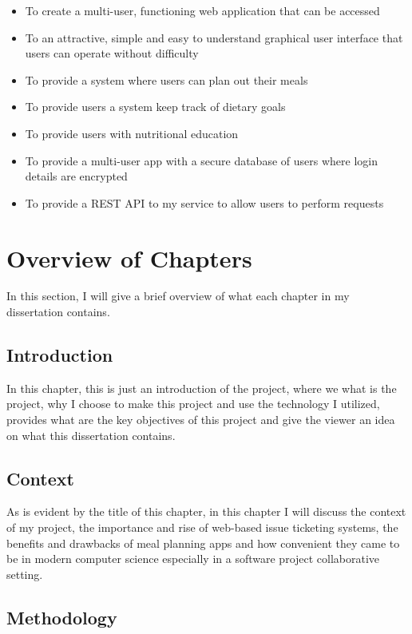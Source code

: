 \begin{itemize}
\item To create a multi-user, functioning web application that can be accessed
\item To an attractive, simple and easy to understand graphical user interface that users can operate without difficulty
\item To provide a system where users can plan out their meals
\item To provide users a system keep track of dietary goals
\item To provide users with nutritional education
\item To provide a multi-user app with a secure database of users where login details are encrypted
\item To provide a REST API to my service to allow users to perform requests
\end{itemize}

\section {Overview of Chapters}

In this section, I will give a brief overview of what each chapter in my dissertation contains.

\subsection{Introduction}

In this chapter, this is just an introduction of the project, where we what is the project, why I choose to make this project and use the technology I utilized, provides what are the key objectives of this project and give the viewer an idea on what this dissertation contains.

\subsection{Context}

As is evident by the title of this chapter, in this chapter I will discuss the context of my project, the importance and rise of web-based issue ticketing systems, the benefits and drawbacks of meal planning apps and how convenient they came to be in modern computer science especially in a software project collaborative setting.

\subsection{Methodology}

